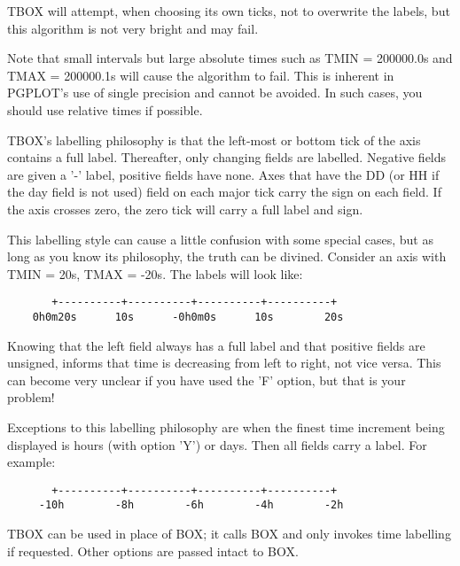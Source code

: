 TBOX will attempt, when choosing its own ticks, not to overwrite the
labels, but this algorithm is not very bright and may fail.

Note that small intervals but large absolute times such as TMIN =
200000.0s and TMAX = 200000.1s will cause the algorithm to fail.  This
is inherent in PGPLOT's use of single precision and cannot be avoided.
In such cases, you should use relative times if possible.

TBOX's labelling philosophy is that the left-most or bottom tick of
the axis contains a full label.  Thereafter, only changing fields are
labelled.  Negative fields are given a '-' label, positive fields have
none.  Axes that have the DD (or HH if the day field is not used)
field on each major tick carry the sign on each field.  If the axis
crosses zero, the zero tick will carry a full label and sign.

This labelling style can cause a little confusion with some special
cases, but as long as you know its philosophy, the truth can be
divined.  Consider an axis with TMIN = 20s, TMAX = -20s.  The labels
will look like:

\begin{verbatim}
       +----------+----------+----------+----------+
    0h0m20s      10s      -0h0m0s      10s        20s
\end{verbatim}

Knowing that the left field always has a full label and that positive
fields are unsigned, informs that time is decreasing from left to
right, not vice versa.  This can become very unclear if you have used
the 'F' option, but that is your problem!

Exceptions to this labelling philosophy are when the finest time
increment being displayed is hours (with option 'Y') or days.  Then
all fields carry a label.  For example:

\begin{verbatim}
       +----------+----------+----------+----------+
     -10h        -8h        -6h        -4h        -2h
\end{verbatim}

TBOX can be used in place of BOX; it calls BOX and only invokes time
labelling if requested.  Other options are passed intact to BOX.


